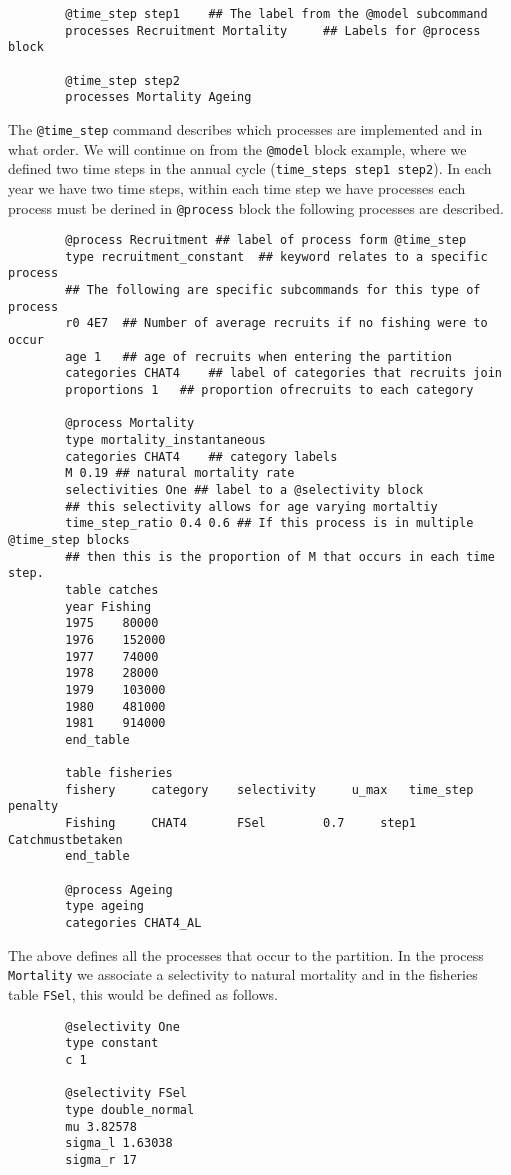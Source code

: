 \documentclass[12pt]{article}
\makeatletter
\newcommand{\command}[1] {\texttt{@#1}}
\makeatother
\begin{document}
{\small{\begin{verbatim}
		@time_step step1 	## The label from the @model subcommand
		processes Recruitment Mortality 	## Labels for @process block
		
		@time_step step2 
		processes Mortality Ageing
		\end{verbatim}}}

The \command{time\_step} command describes which processes are implemented and in what order. We will continue on from the \command{model} block example, where we defined two time steps in the annual cycle (\texttt{time\_steps step1 step2}). In each year we have two time steps, within each time step we have processes each process must be derined in \command{process} block the following processes are described.

{\small{\begin{verbatim}
		@process Recruitment ## label of process form @time_step
		type recruitment_constant  ## keyword relates to a specific process
		## The following are specific subcommands for this type of process
		r0 4E7	## Number of average recruits if no fishing were to occur
		age 1	## age of recruits when entering the partition
		categories CHAT4	## label of categories that recruits join
		proportions 1	## proportion ofrecruits to each category
		
		@process Mortality 
		type mortality_instantaneous
		categories CHAT4	## category labels
		M 0.19 ## natural mortality rate
		selectivities One ## label to a @selectivity block
		## this selectivity allows for age varying mortaltiy
		time_step_ratio 0.4 0.6 ## If this process is in multiple @time_step blocks
		## then this is the proportion of M that occurs in each time step.
		table catches
		year Fishing 
		1975	80000
		1976	152000
		1977	74000
		1978	28000
		1979	103000
		1980	481000
		1981	914000
		end_table
		
		table fisheries
		fishery  	category 	selectivity 	u_max 	time_step 	penalty
		Fishing   	CHAT4   	FSel 		0.7 	step1 		Catchmustbetaken
		end_table
		
		@process Ageing
		type ageing
		categories CHAT4_AL
		\end{verbatim}}}

The above defines all the processes that occur to the partition. In the process  \texttt{Mortality} we associate a selectivity to natural mortality and in the fisheries table \texttt{FSel}, this would be defined as follows. 
{\small{\begin{verbatim}
		@selectivity One
		type constant 
		c 1
		
		@selectivity FSel
		type double_normal 
		mu 3.82578 
		sigma_l 1.63038 
		sigma_r 17
		\end{verbatim}}}
\end{document}
